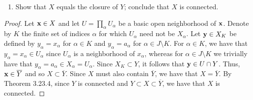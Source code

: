 \begin{solution}
  \begin{enumerate}[label={(\alph*)}, align=left, leftmargin=\parindent, listparindent=\parindent, labelwidth=0pt, itemindent=!]
    \addtocounter{enumi}{2} 
    \item
      Show that $X$ equals the closure of $Y$;
      conclude that $X$ is connected.
  \end{enumerate}
  \begin{proof}
    Let $\mathbf{x} \in X$ and let $U = \prod_\alpha U_\alpha$ be a basic open neighborhood of $\mathbf{x}$.
    Denote by $K$ the finite set of indices $\alpha$ for which $U_\alpha$ need not be $X_\alpha$.
    Let $\mathbf{y} \in X_K$ be defined by $y_\alpha = x_\alpha$ for $\alpha \in K$ and $y_\alpha = a_\alpha$ for $\alpha \in J \setminus K$.
    For $\alpha \in K$, we have that $y_\alpha = x_\alpha \in U_\alpha$ since $U_\alpha$ is a neighborhood of $x_\alpha$, whereas for $\alpha \in J \setminus K$ we trivially have that $y_\alpha = a_\alpha \in X_\alpha = U_\alpha$.
    Since $X_K \subset Y$, it follows that $\mathbf{y} \in U \cap Y$.
    Thus, $\mathbf{x} \in \overline{Y}$ and so $X \subset \overline{Y}$.
    Since $X$ must also contain $\overline{Y}$, we have that $X = \overline{Y}$.
    By Theorem 3.23.4, since $Y$ is connected and $Y \subset X \subset \overline{Y}$, we have that $X$ is connected.
  \end{proof}
\end{solution}
\newpage

